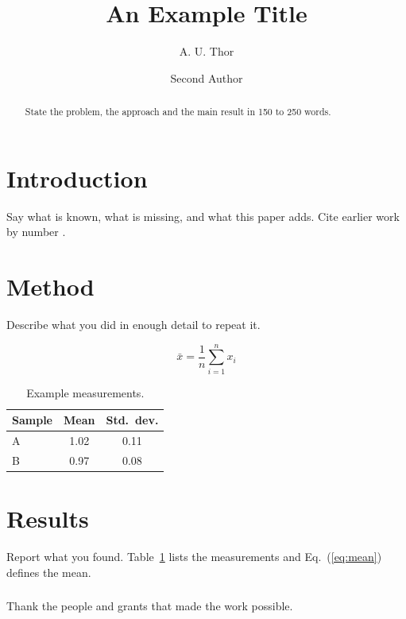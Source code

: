 \documentclass[runningheads]{llncs}
\begin{document}
\title{An Example Title}

\author{A. U. Thor \and
Second Author}


\maketitle

\begin{abstract}
State the problem, the approach and the main result in 150 to 250 words.

\end{abstract}

\section{Introduction}

Say what is known, what is missing, and what this paper adds. Cite earlier
work by number \cite{einstein1905,knuth1984}.

\section{Method}

Describe what you did in enough detail to repeat it.

\begin{equation}
  \bar{x} = \frac{1}{n} \sum_{i=1}^{n} x_i
  \label{eq:mean}
\end{equation}

\begin{table}
  \caption{Example measurements.}
  \label{tab:results}
  \centering
  \begin{tabular}{|l|c|c|}
    \hline
    Sample & Mean & Std.\ dev. \\
    \hline
    A & 1.02 & 0.11 \\
    B & 0.97 & 0.08 \\
    \hline
  \end{tabular}
\end{table}

\section{Results}

Report what you found. Table~\ref{tab:results} lists the measurements and
Eq.~(\ref{eq:mean}) defines the mean.

\begin{credits}
\subsubsection{\ackname} Thank the people and grants that made the work possible.
\end{credits}



\end{document}
